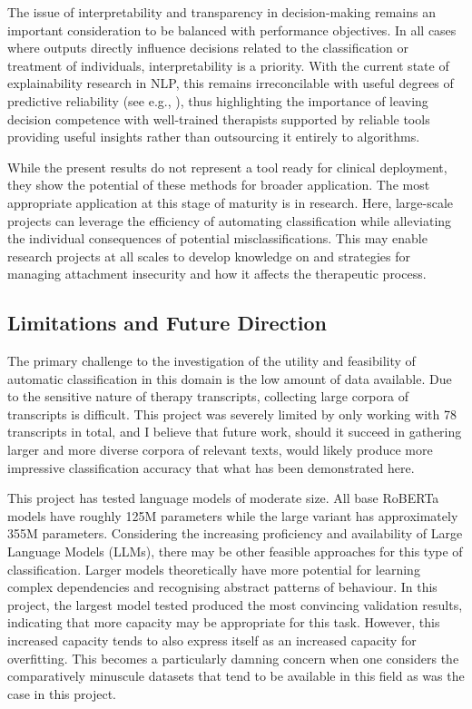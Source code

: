 \documentclass[12pt]{report}
\begin{document}
The issue of interpretability and transparency in decision-making remains an important consideration to be balanced with performance objectives.
In all cases where outputs directly influence decisions related to the classification or treatment of individuals, interpretability is a priority.
With the current state of explainability research in NLP, this remains irreconcilable with useful degrees of predictive reliability (see e.g., ), thus highlighting the importance of leaving decision competence with well-trained therapists supported by reliable tools providing useful insights rather than outsourcing it entirely to algorithms.

While the present results do not represent a tool ready for clinical deployment, they show the potential of these methods for broader application.
The most appropriate application at this stage of maturity is in research.
Here, large-scale projects can leverage the efficiency of automating classification while alleviating the individual consequences of potential misclassifications.
This may enable research projects at all scales to develop knowledge on and strategies for managing attachment insecurity and how it affects the therapeutic process.

\subsection{Limitations and Future Direction}
The primary challenge to the investigation of the utility and feasibility of automatic classification in this domain is the low amount of data available.
Due to the sensitive nature of therapy transcripts, collecting large corpora of transcripts is difficult.
This project was severely limited by only working with 78 transcripts in total, and I believe that future work, should it succeed in gathering larger and more diverse corpora of relevant texts, would likely produce more impressive classification accuracy that what has been demonstrated here.

This project has tested language models of moderate size. All base RoBERTa models have roughly 125M parameters while the large variant has approximately 355M parameters.
Considering the increasing proficiency and availability of Large Language Models (LLMs), there may be other feasible approaches for this type of classification.
Larger models theoretically have more potential for learning complex dependencies and recognising abstract patterns of behaviour.
In this project, the largest model tested produced the most convincing validation results, indicating that more capacity may be appropriate for this task.
However, this increased capacity tends to also express itself as an increased capacity for overfitting.
This becomes a particularly damning concern when one considers the comparatively minuscule datasets that tend to be available in this field as was the case in this project.
\end{document}
